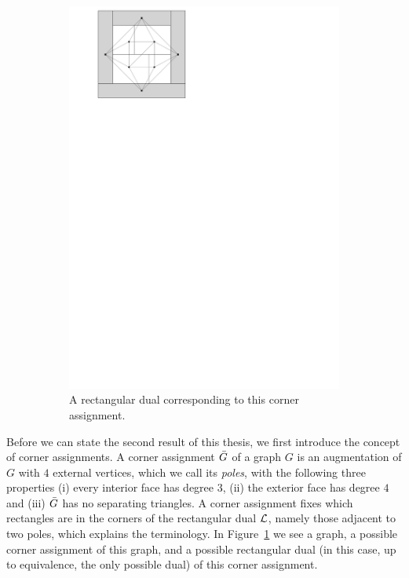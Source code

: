 \begin{figure}
\begin{subfigure}[t]{3cm}
        \includegraphics[scale=.3]{introduction/img/caDual.pdf}
        \caption{A rectangular dual corresponding to this corner assignment.}
      \end{subfigure}
    \caption{}
    \label{fig:intro:cornerAssign}
  \end{figure}

  Before we can state the second result of this thesis, we first introduce the concept of corner assignments.
  A corner assignment $\bar{G}$ of a graph $G$ is an augmentation of $G$ with $4$ external vertices, which we call its \emph{poles}, with the following three properties (i) every interior face has degree $3$, (ii) the exterior face has degree $4$ and (iii) $\bar{G}$ has no separating triangles.
  A corner assignment fixes which rectangles are in the corners of the rectangular dual $\mathcal{L}$, namely those adjacent to two poles, which explains the terminology. In Figure~\ref{fig:intro:cornerAssign} we see a graph, a possible corner assignment of this graph, and a possible rectangular dual (in this case, up to equivalence, the only possible dual) of this corner assignment.

